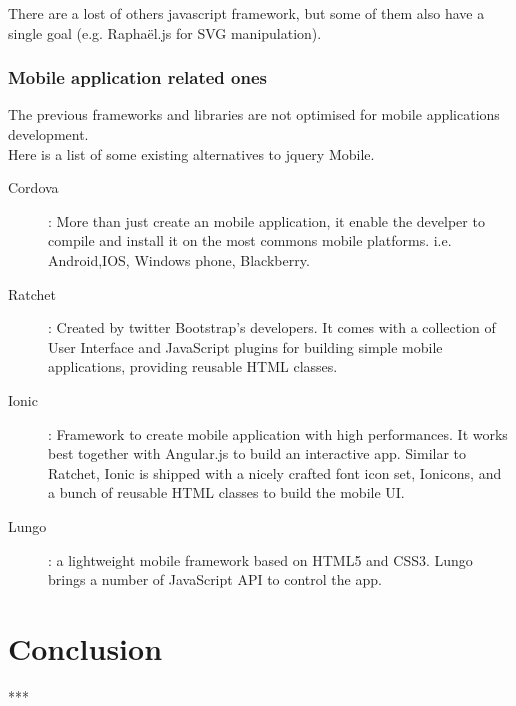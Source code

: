 \documentclass[12pt]{report}%
\begin{document}
There are a lost of others javascript framework, but some of them also have a single goal (e.g. Raphaël.js for SVG manipulation).


\subsection{Mobile application related ones}
The previous frameworks and libraries are not optimised for mobile applications development.\\
Here is a list of some existing alternatives to jquery Mobile.

\begin{description}
	\item[Cordova] : More than just create an mobile application, it enable the develper to compile and install it on the most commons mobile platforms. i.e. Android,IOS, Windows phone, Blackberry.
	\item[Ratchet] : Created by twitter Bootstrap's developers. It comes with a collection of User Interface and JavaScript plugins for building simple mobile applications, providing reusable HTML classes.
	\item[Ionic] : Framework to create mobile application with high performances. It works best together with Angular.js to build an interactive app. Similar to Ratchet, Ionic is shipped with a nicely crafted font icon set, Ionicons, and a bunch of reusable HTML classes to build the mobile UI.
	\item[Lungo] : a lightweight mobile framework based on HTML5 and CSS3. Lungo brings a number of JavaScript API to control the app.
\end{description}


\chapter{Conclusion}
***

\clearpage
\end{document}
